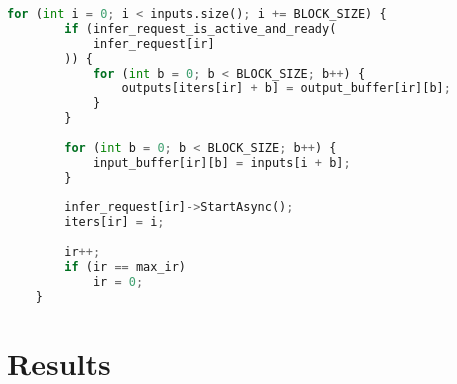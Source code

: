 \begin{minipage}{\linewidth}
\begin{lstlisting}[frame=single, tabsize=4, caption={Most efficient implementation of algorithmic transformation of an error tolerant-function using OpenVINO.},label={lst:async_code},language=Python,captionpos=b]
	for (int i = 0; i < inputs.size(); i += BLOCK_SIZE) {
		if (infer_request_is_active_and_ready(
            infer_request[ir]
        )) {
			for (int b = 0; b < BLOCK_SIZE; b++) {
				outputs[iters[ir] + b] = output_buffer[ir][b];
			}
		}
		
		for (int b = 0; b < BLOCK_SIZE; b++) {
			input_buffer[ir][b] = inputs[i + b];
		}
		
		infer_request[ir]->StartAsync();
		iters[ir] = i;
		
		ir++;
		if (ir == max_ir)
			ir = 0;
	}
\end{lstlisting}
\end{minipage}

\section{Results}

\begin{table}[thbp]
	\caption{Neural network topologies.}
	\centering
	\label{tab:nn_topologies}
\end{table}

